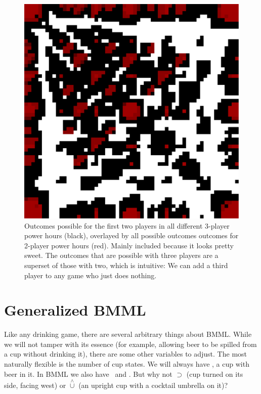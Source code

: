 \documentclass[twocolumn]{article}
\begin{document}
\begin{figure}
\begin{center}
\includegraphics[width=0.90 \linewidth]{3and2.pdf}
\end{center}\vspace{-0.1in}
\caption{Outcomes possible for the first two players in all different
  3-player power hours (black), overlayed by all possible outcomes
  outcomes for 2-player power hours (red). Mainly included because
  it looks pretty sweet. The outcomes that are possible with three
  players are a superset of those with two, which is intuitive: We
  can add a third player to any game who just does nothing.}
\label{fig:3and2}
\end{figure}

\section{Generalized BMML}

Like any drinking game, there are several arbitrary things about BMML.
While we will not tamper with its essence (for example, allowing beer
to be spilled from a cup without drinking it), there are some other
variables to adjust. The most naturally flexible is the number of cup
states. We will always have \fullcup, a cup with beer in it. In BMML
we also have \emptycup\ and \overcup. But why not $\supset$ (cup
turned on its side, facing west) or $\stackrel{\wedge}{\cup}$ (an
upright cup with a cocktail umbrella on it)?
\end{document}
